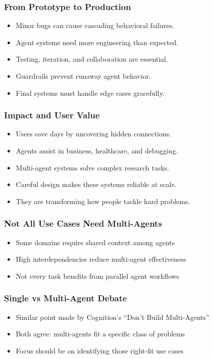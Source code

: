 \begin{frame}[fragile]\frametitle{From Prototype to Production}
    \begin{itemize}
        \item Minor bugs can cause cascading behavioral failures.
        \item Agent systems need more engineering than expected.
        \item Testing, iteration, and collaboration are essential.
        \item Guardrails prevent runaway agent behavior.
        \item Final systems must handle edge cases gracefully.
    \end{itemize}
\end{frame}

\begin{frame}[fragile]\frametitle{Impact and User Value}
    \begin{itemize}
        \item Users save days by uncovering hidden connections.
        \item Agents assist in business, healthcare, and debugging.
        \item Multi-agent systems solve complex research tasks.
        \item Careful design makes these systems reliable at scale.
        \item They are transforming how people tackle hard problems.
    \end{itemize}
\end{frame}


\begin{frame}[fragile]\frametitle{Not All Use Cases Need Multi-Agents}
    \begin{itemize}
        \item Some domains require shared context among agents
        \item High interdependencies reduce multi-agent effectiveness
        \item Not every task benefits from parallel agent workflows
    \end{itemize}
\end{frame}

\begin{frame}[fragile]\frametitle{Single vs Multi-Agent Debate}
    \begin{itemize}
        \item Similar point made by Cognition's ``Don't Build Multi-Agents''
        \item Both agree: multi-agents fit a specific class of problems
        \item Focus should be on identifying those right-fit use cases
    \end{itemize}
\end{frame}

